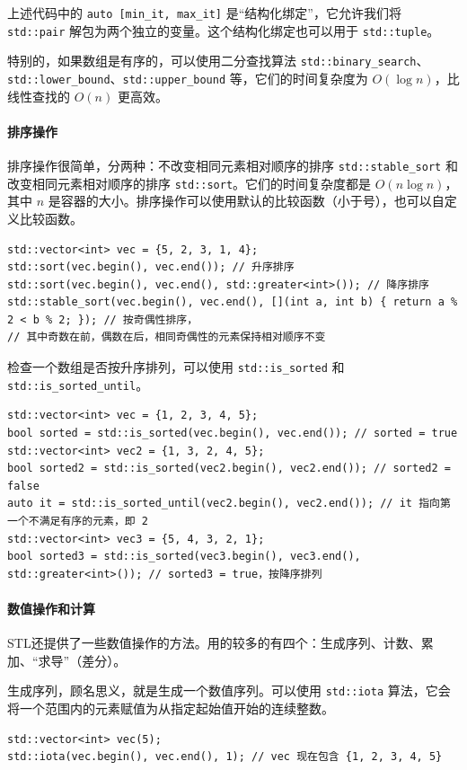 上述代码中的 \verb|auto [min_it, max_it]| 是“结构化绑定”，它允许我们将 \verb|std::pair| 解包为两个独立的变量。这个结构化绑定也可以用于 \verb|std::tuple|。

特别的，如果数组是有序的，可以使用二分查找算法 \verb|std::binary_search|、\verb|std::lower_bound|、\verb|std::upper_bound| 等，它们的时间复杂度为 $O(\log n)$，比线性查找的 $O(n)$ 更高效。

\paragraph{排序操作} 

排序操作很简单，分两种：不改变相同元素相对顺序的排序 \verb|std::stable_sort| 和改变相同元素相对顺序的排序 \verb|std::sort|。它们的时间复杂度都是 $O(n \log n)$，其中 $n$ 是容器的大小。排序操作可以使用默认的比较函数（小于号），也可以自定义比较函数。
\begin{verbatim}
std::vector<int> vec = {5, 2, 3, 1, 4};
std::sort(vec.begin(), vec.end()); // 升序排序
std::sort(vec.begin(), vec.end(), std::greater<int>()); // 降序排序
std::stable_sort(vec.begin(), vec.end(), [](int a, int b) { return a % 2 < b % 2; }); // 按奇偶性排序，
// 其中奇数在前，偶数在后，相同奇偶性的元素保持相对顺序不变
\end{verbatim}

检查一个数组是否按升序排列，可以使用 \verb|std::is_sorted| 和 \verb|std::is_sorted_until|。
\begin{verbatim}
std::vector<int> vec = {1, 2, 3, 4, 5};
bool sorted = std::is_sorted(vec.begin(), vec.end()); // sorted = true
std::vector<int> vec2 = {1, 3, 2, 4, 5};
bool sorted2 = std::is_sorted(vec2.begin(), vec2.end()); // sorted2 = false
auto it = std::is_sorted_until(vec2.begin(), vec2.end()); // it 指向第一个不满足有序的元素，即 2
std::vector<int> vec3 = {5, 4, 3, 2, 1};
bool sorted3 = std::is_sorted(vec3.begin(), vec3.end(), std::greater<int>()); // sorted3 = true，按降序排列
\end{verbatim}

\paragraph{数值操作和计算} STL还提供了一些数值操作的方法。用的较多的有四个：生成序列、计数、累加、“求导”（差分）。

生成序列，顾名思义，就是生成一个数值序列。可以使用 \verb|std::iota| 算法，它会将一个范围内的元素赋值为从指定起始值开始的连续整数。
\begin{verbatim}
std::vector<int> vec(5);
std::iota(vec.begin(), vec.end(), 1); // vec 现在包含 {1, 2, 3, 4, 5}
\end{verbatim}

